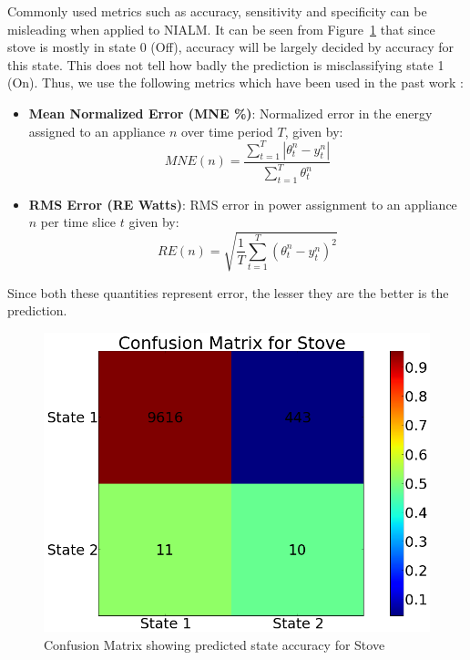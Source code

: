 \documentclass[conference]{IEEEtran}
\newcommand{\figref}[1]{Figure~\ref{#1}}
\begin{document}
Commonly used metrics such as accuracy, sensitivity and specificity can be misleading when applied to NIALM. It can be seen from \figref{fig:confusion} that since stove is mostly in state 0 (Off), accuracy will be largely decided by accuracy for this state. This does not tell how badly the prediction is misclassifying state 1 (On). 
Thus, we use the following metrics which have been used in the past work \cite{parson2012_aaai,redd}:
\begin{itemize}
\item \textbf{Mean Normalized Error (MNE \%)}: Normalized error in the energy assigned to an appliance $n$ over time period $T$, given by:
\begin{equation}
MNE(n)=\frac{\sum\limits_{t=1}^{T}|\theta_t^n-y_t^n|}{\sum\limits_{t=1}^{T}\theta_t^n} 
\end{equation} 
\item \textbf{RMS Error (RE Watts)}: RMS error in power assignment to an appliance $n$ per time slice $t$ given by:
\begin{equation}
RE(n)=\sqrt{\frac{1}{T}\sum\limits_{t=1}^{T}(\theta_t^n-y_t^n)^2}
\end{equation}

\end{itemize} 
Since both these quantities represent error, the lesser they are the better is the prediction.
\begin{figure}
\centering \includegraphics[scale=0.2]{./figures/confusion_stove.png}
\caption{Confusion Matrix showing predicted state accuracy for Stove}
   \label{fig:confusion}
\end{figure}
\end{document}
